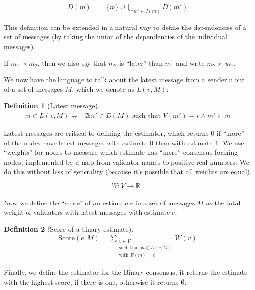 \documentclass{article}
\theoremstyle{definition}
\newtheorem{defn}{Definition}[section]
\begin{document}
\begin{equation*}
\begin{split}
D(m) = &\{m\}\cup \bigcup_{m' \in J(m)} D(m')
\end{split}
\end{equation*}

This definition can be extended in a natural way to define the dependencies of a set of messages (by taking the union of the dependencies of the individual messages).

If $m_1 \prec m_2$, then we also say that $m_2$ is ``later'' than $m_1$ and write $m_2 \succ m_1$.

We now have the language to talk about the latest message from a sender $v$ out of a set of messages $M$, which we denote as $L(v, M)$:

\begin{defn}[Latest message]
\begin{equation*}
\begin{split}
m \in L(v, M) \iff & \nexists m' \in D(M) \text{ such that } V(m') = v \land m' \succ m
\end{split}
\end{equation*}
\end{defn}

Latest messages are critical to defining the estimator, which returns $0$ if ``more'' of the nodes have latest messages with estimate $0$ than with estimate $1$. We use ``weights'' for nodes to measure which estimate has ``more'' consensus forming nodes, implemented by a map from validator names to positive real numbers. We do this without loss of generality (because it's possible that all weights are equal).

$$
W:V \to \mathbb{R}_+
$$


Now we define the ``score'' of an estimate $e$ in a set of messages $M$ as the total weight of validators with latest messages with estimate $e$.

\begin{defn}[Score of a binary estimate]
\begin{align}
\text{Score}(e, M) = \sum_{\substack{v \in V \\ \text{such that } m \in L(v,M) \\ \text{with } E(m) = e}} W(v)
\end{align}
\end{defn}

Finally, we define the estimator for the Binary consensus, it returns the estimate with the highest score, if there is one, otherwise it returns $\emptyset$.
\end{document}
